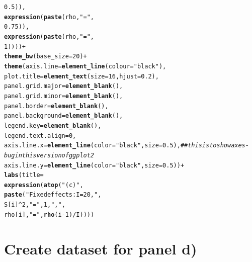 \documentclass{article}\usepackage[]{graphicx}\usepackage[]{color}
\makeatletter
\newcommand{\hlnum}[1]{\textcolor[rgb]{0.686,0.059,0.569}{#1}}%
\newcommand{\hlstr}[1]{\textcolor[rgb]{0.192,0.494,0.8}{#1}}%
\newcommand{\hlcom}[1]{\textcolor[rgb]{0.678,0.584,0.686}{\textit{#1}}}%
\newcommand{\hlopt}[1]{\textcolor[rgb]{0,0,0}{#1}}%
\newcommand{\hlstd}[1]{\textcolor[rgb]{0.345,0.345,0.345}{#1}}%
\newcommand{\hlkwc}[1]{\textcolor[rgb]{0.333,0.667,0.333}{#1}}%
\newcommand{\hlkwd}[1]{\textcolor[rgb]{0.737,0.353,0.396}{\textbf{#1}}}%
\newenvironment{kframe}{%
 \def\at@end@of@kframe{}%
 \ifinner\ifhmode%
  \def\at@end@of@kframe{\end{minipage}}%
  \begin{minipage}{\columnwidth}%
 \fi\fi%
 \def\FrameCommand##1{\hskip\@totalleftmargin \hskip-\fboxsep
 \colorbox{shadecolor}{##1}\hskip-\fboxsep
     \hskip-\linewidth \hskip-\@totalleftmargin \hskip\columnwidth}%
 \MakeFramed {\advance\hsize-\width
   \@totalleftmargin\z@ \linewidth\hsize
   \@setminipage}}%
 {\par\unskip\endMakeFramed%
 \at@end@of@kframe}
\newenvironment{knitrout}{}{} %
\makeatother
\begin{document}
\begin{knitrout}
\begin{kframe}
\begin{alltt}
                                            \hlnum{0.5}\hlstd{)),}
                           \hlkwd{expression}\hlstd{(}\hlkwd{paste}\hlstd{(rho,} \hlstr{"="}\hlstd{,}
                                            \hlnum{0.75}\hlstd{)),}
                           \hlkwd{expression}\hlstd{(}\hlkwd{paste}\hlstd{(rho,} \hlstr{"="}\hlstd{,}
                                            \hlnum{1}\hlstd{))))} \hlopt{+}
  \hlkwd{theme_bw}\hlstd{(}\hlkwc{base_size} \hlstd{=} \hlnum{20}\hlstd{)} \hlopt{+}
  \hlkwd{theme}\hlstd{(}\hlkwc{axis.line} \hlstd{=} \hlkwd{element_line}\hlstd{(}\hlkwc{colour} \hlstd{=} \hlstr{"black"}\hlstd{),}
        \hlkwc{plot.title} \hlstd{=} \hlkwd{element_text}\hlstd{(}\hlkwc{size} \hlstd{=} \hlnum{16}\hlstd{,} \hlkwc{hjust} \hlstd{=} \hlnum{0.2}\hlstd{),}
        \hlkwc{panel.grid.major} \hlstd{=} \hlkwd{element_blank}\hlstd{(),}
        \hlkwc{panel.grid.minor} \hlstd{=} \hlkwd{element_blank}\hlstd{(),}
        \hlkwc{panel.border} \hlstd{=} \hlkwd{element_blank}\hlstd{(),}
        \hlkwc{panel.background} \hlstd{=} \hlkwd{element_blank}\hlstd{(),}
        \hlkwc{legend.key} \hlstd{=} \hlkwd{element_blank}\hlstd{(),}
        \hlkwc{legend.text.align} \hlstd{=} \hlnum{0}\hlstd{,}
        \hlkwc{axis.line.x} \hlstd{=} \hlkwd{element_line}\hlstd{(}\hlkwc{color}\hlstd{=}\hlstr{"black"}\hlstd{,} \hlkwc{size} \hlstd{=} \hlnum{0.5}\hlstd{),} \hlcom{##this is to show axes - bug in this version of ggplot2}
        \hlkwc{axis.line.y} \hlstd{=} \hlkwd{element_line}\hlstd{(}\hlkwc{color}\hlstd{=}\hlstr{"black"}\hlstd{,} \hlkwc{size} \hlstd{=} \hlnum{0.5}\hlstd{))} \hlopt{+}
  \hlkwd{labs}\hlstd{(}\hlkwc{title}\hlstd{=}
         \hlkwd{expression}\hlstd{(}\hlkwd{atop}\hlstd{(}\hlstr{"(c)"}\hlstd{,}
                         \hlkwd{paste}\hlstd{(}\hlstr{"Fixed effects: I = 20, "}\hlstd{,}
                               \hlstd{S[i]}\hlopt{^}\hlnum{2}\hlstd{,} \hlstr{" = "}\hlstd{,} \hlnum{1}\hlstd{,} \hlstr{", "}\hlstd{,}
                               \hlstd{rho[i],} \hlstr{" = "}\hlstd{,} \hlkwd{rho}\hlstd{(i}\hlopt{-}\hlnum{1}\hlstd{)}\hlopt{/}\hlstd{I))))}
\end{alltt}
\end{kframe}
\end{knitrout}

\section{Create dataset for panel d)}
\end{document}

